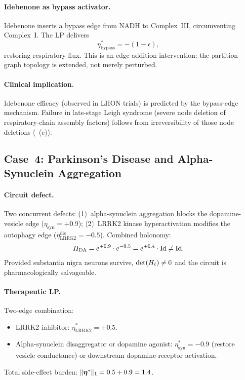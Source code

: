 \paragraph{Idebenone as bypass activator.}
Idebenone inserts a bypass edge from NADH to Complex~III, circumventing
Complex~I.  The LP delivers
\begin{equation}
  \eta_{\mathrm{bypass}}^* = -(1 - \epsilon),
  \label{eq:ch09-idebenone}
\end{equation}
restoring respiratory flux.  This is an edge-addition intervention: the
partition graph topology is extended, not merely perturbed.

\paragraph{Clinical implication.}
Idebenone efficacy (observed in LHON trials) is predicted by the bypass-edge
mechanism.  Failure in late-stage Leigh syndrome (severe node deletion of
respiratory-chain assembly factors) follows from irreversibility of those
node deletions (~(c)).

\subsection{Case~4: Parkinson's Disease and Alpha-Synuclein Aggregation}
\label{subsec:ch09-parkinsons}

\paragraph{Circuit defect.}
Two concurrent defects: (1)~alpha-synuclein aggregation blocks the
dopamine-vesicle edge ($\eta_{\mathrm{syn}} = +0.9$); (2)~LRRK2 kinase
hyperactivation modifies the autophagy edge
($\eta_{\mathrm{LRRK2}}^{\mathrm{dis}} = -0.5$).  Combined holonomy:
\begin{equation}
  H_{\mathrm{DA}} = e^{+0.9}\cdot e^{-0.5} = e^{+0.4}\cdot\mathrm{Id} \neq \mathrm{Id}.
  \label{eq:ch09-pd-holonomy}
\end{equation}
Provided substantia nigra neurons survive, $\det(H_\ell) \neq 0$ and the
circuit is pharmacologically salvageable.

\paragraph{Therapeutic LP.}
Two-edge combination:
\begin{itemize}[leftmargin=2em]
  \item LRRK2 inhibitor: $\eta_{\mathrm{LRRK2}}^* = +0.5$.
  \item Alpha-synuclein disaggregator or dopamine agonist:
    $\eta_{\mathrm{syn}}^* = -0.9$ (restore vesicle conductance)
    or downstream dopamine-receptor activation.
\end{itemize}
Total side-effect burden: $\|\boldsymbol{\eta}^*\|_1 = 0.5 + 0.9 = 1.4$.

